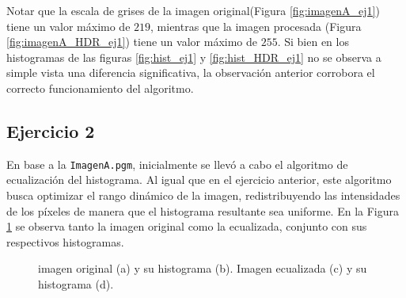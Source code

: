 \documentclass[11pt, twocolumn]{article}
\begin{document}
Notar que la escala de grises de la imagen original(Figura \ref{fig:imagenA_ej1}) tiene un valor máximo de $219$, mientras que la imagen procesada (Figura \ref{fig:imagenA_HDR_ej1}) tiene un valor máximo de $255$. Si bien en los histogramas de las figuras \ref{fig:hist_ej1} y \ref{fig:hist_HDR_ej1} no se observa a simple vista una diferencia significativa, la observación anterior corrobora el correcto funcionamiento del algoritmo.


\subsection*{Ejercicio 2}
En base a la \texttt{ImagenA.pgm}, inicialmente se llevó a cabo el algoritmo de ecualización del histograma. Al igual que en el ejercicio anterior, este algoritmo busca optimizar el rango dinámico de la imagen, redistribuyendo las intensidades de los píxeles de manera que el histograma resultante sea uniforme. En la Figura \ref{fig:figuras_ej_2} se observa tanto la imagen original como la ecualizada, conjunto con sus respectivos histogramas.

\begin{figure}[htbp]
  \centering
  \hfill
  \hfill
  \hfill
  \hfill
  \caption{imagen original (a) y su histograma (b). Imagen ecualizada (c) y su histograma (d).}
  \label{fig:figuras_ej_2}
\end{figure}
\end{document}
